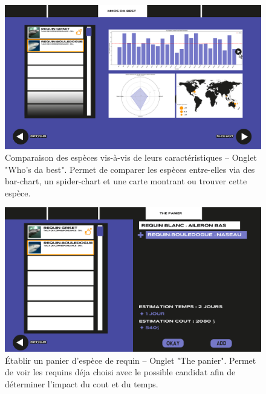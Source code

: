 \documentclass{article}
\begin{document}
\begin{figure}[!h]
	\centering
	\includegraphics[width=14.4cm]{assets/prototype/basse/onglet3}
	\caption{ Comparaison des espèces vis-à-vis de leurs caractéristiques – Onglet "Who's da best". Permet de comparer les espèces entre-elles via des bar-chart, un spider-chart et une carte montrant ou trouver cette espèce.}
	\label{onglet3}
\end{figure}

\vspace{1cm}

\begin{figure}[!h]
	\centering
	\includegraphics[width=14.4cm]{assets/prototype/basse/onglet4}
	\caption{Établir un panier d’espèce de requin – Onglet "The panier". Permet de voir les requins déja choisi avec le possible candidat afin de déterminer l'impact du cout et du temps.}
	\label{onglet4}
\end{figure}
\end{document}
